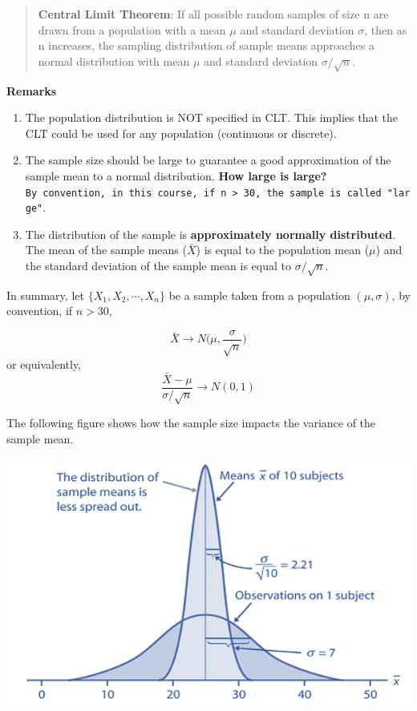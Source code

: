 \documentclass[
]{book}
\begin{document}
\begin{quote}
\textbf{Central Limit Theorem}: If all possible random samples of size n are drawn from a population with a mean \(\mu\) and standard deviation \(\sigma\), then as n increases, the sampling distribution of sample means approaches a normal distribution with mean \(\mu\) and standard deviation \(\sigma/\sqrt{n}\).
\end{quote}

\textbf{Remarks}

\begin{enumerate}
\def\labelenumi{\arabic{enumi}.}
\item
  The population distribution is NOT specified in CLT. This implies that the CLT could be used for any population (continuous or discrete).
\item
  The sample size should be large to guarantee a good approximation of the sample mean to a normal distribution. \textbf{How large is large?} \texttt{By\ convention,\ in\ this\ course,\ if\ n\ \textgreater{}\ 30,\ the\ sample\ is\ called\ "large"}.
\item
  The distribution of the sample is \textbf{approximately normally distributed}. The mean of the sample means (\(\bar{X}\)) is equal to the population mean (\(\mu\)) and the standard deviation of the sample mean is equal to \(\sigma/\sqrt{n}\).
\end{enumerate}

In summary, let \(\{X_1, X_2, \cdots, X_n \}\) be a sample taken from a population \((\mu, \sigma)\), by convention, if \(n > 30\),

\[
\bar{X} \to N \big(\mu, \frac{\sigma}{\sqrt{n}} \big)
\]
or equivalently,
\[
\frac{\bar{X}-\mu}{\sigma/\sqrt{n}} \to N(0, 1)
\]

The following figure shows how the sample size impacts the variance of the sample mean.

\begin{center}\includegraphics[width=0.6\linewidth]{week05/CLT} \end{center}
\end{document}
